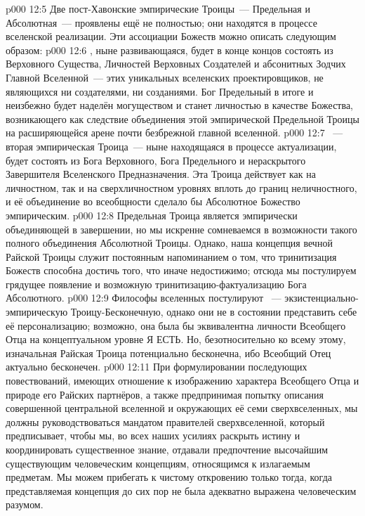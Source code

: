 \vs p000 12:5 \pc Две пост\hyp{}Хавонские эмпирические Троицы~--- Предельная и Абсолютная~--- проявлены ещё не полностью; они находятся в процессе вселенской реализации. Эти ассоциации Божеств можно описать следующим образом:
\vs p000 12:6 , ныне развивающаяся, будет в конце концов состоять из Верховного Существа, Личностей Верховных Создателей и абсонитных Зодчих Главной Вселенной~--- этих уникальных вселенских проектировщиков, не являющихся ни создателями, ни созданиями. Бог Предельный в итоге и неизбежно будет наделён могуществом и станет личностью в качестве Божества, возникающего как следствие объединения этой эмпирической Предельной Троицы на расширяющейся арене почти безбрежной главной вселенной.
\vs p000 12:7 ~--- вторая эмпирическая Троица~--- ныне находящаяся в процессе актуализации, будет состоять из Бога Верховного, Бога Предельного и нераскрытого Завершителя Вселенского Предназначения. Эта Троица действует как на личностном, так и на сверхличностном уровнях вплоть до границ неличностного, и её объединение во всеобщности сделало бы Абсолютное Божество эмпирическим.
\vs p000 12:8 \pc Предельная Троица является эмпирически объединяющей в завершении, но мы искренне сомневаемся в возможности такого полного объединения Абсолютной Троицы. Однако, наша концепция вечной Райской Троицы служит постоянным напоминанием о том, что тринитизация Божеств способна достичь того, что иначе недостижимо; отсюда мы постулируем грядущее появление  и возможную тринитизацию\hyp{}фактуализацию Бога Абсолютного.
\vs p000 12:9 \pc Философы вселенных постулируют ~--- экзистенциально\hyp{}эмпирическую Троицу\hyp{}Бесконечную, однако они не в состоянии представить себе её персонализацию; возможно, она была бы эквивалентна личности Всеобщего Отца на концептуальном уровне Я ЕСТЬ. Но, безотносительно ко всему этому, изначальная Райская Троица потенциально бесконечна, ибо Всеобщий Отец актуально бесконечен.
\vs p000 12:11 При формулировании последующих повествований, имеющих отношение к изображению характера Всеобщего Отца и природе его Райских партнёров, а также предпринимая попытку описания совершенной центральной вселенной и окружающих её семи сверхвселенных, мы должны руководствоваться мандатом правителей сверхвселенной, который предписывает, чтобы мы, во всех наших усилиях раскрыть истину и координировать существенное знание, отдавали предпочтение высочайшим существующим человеческим концепциям, относящимся к излагаемым предметам. Мы можем прибегать к чистому откровению только тогда, когда представляемая концепция до сих пор не была адекватно выражена человеческим разумом.

